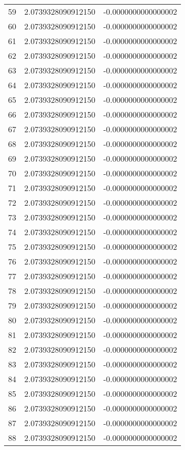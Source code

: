 \begin{tabular}{lrr}
59 & 2.0739328090912150 & -0.0000000000000002 \\
60 & 2.0739328090912150 & -0.0000000000000002 \\
61 & 2.0739328090912150 & -0.0000000000000002 \\
62 & 2.0739328090912150 & -0.0000000000000002 \\
63 & 2.0739328090912150 & -0.0000000000000002 \\
64 & 2.0739328090912150 & -0.0000000000000002 \\
65 & 2.0739328090912150 & -0.0000000000000002 \\
66 & 2.0739328090912150 & -0.0000000000000002 \\
67 & 2.0739328090912150 & -0.0000000000000002 \\
68 & 2.0739328090912150 & -0.0000000000000002 \\
69 & 2.0739328090912150 & -0.0000000000000002 \\
70 & 2.0739328090912150 & -0.0000000000000002 \\
71 & 2.0739328090912150 & -0.0000000000000002 \\
72 & 2.0739328090912150 & -0.0000000000000002 \\
73 & 2.0739328090912150 & -0.0000000000000002 \\
74 & 2.0739328090912150 & -0.0000000000000002 \\
75 & 2.0739328090912150 & -0.0000000000000002 \\
76 & 2.0739328090912150 & -0.0000000000000002 \\
77 & 2.0739328090912150 & -0.0000000000000002 \\
78 & 2.0739328090912150 & -0.0000000000000002 \\
79 & 2.0739328090912150 & -0.0000000000000002 \\
80 & 2.0739328090912150 & -0.0000000000000002 \\
81 & 2.0739328090912150 & -0.0000000000000002 \\
82 & 2.0739328090912150 & -0.0000000000000002 \\
83 & 2.0739328090912150 & -0.0000000000000002 \\
84 & 2.0739328090912150 & -0.0000000000000002 \\
85 & 2.0739328090912150 & -0.0000000000000002 \\
86 & 2.0739328090912150 & -0.0000000000000002 \\
87 & 2.0739328090912150 & -0.0000000000000002 \\
88 & 2.0739328090912150 & -0.0000000000000002 \\

\end{tabular}
